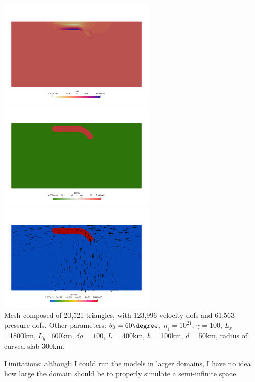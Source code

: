 \begin{center}
\includegraphics[width=7.5cm]{python_codes/fieldstone_55/images/press}\\
\includegraphics[width=7.5cm]{python_codes/fieldstone_55/images/rho}
\includegraphics[width=7.5cm]{python_codes/fieldstone_55/images/eta}\\
{\scriptsize Mesh composed of 20,521 triangles, with 123,996 velocity dofs and 61,563 pressure dofs.
Other parameters: $\theta_0=60\degree$, $\eta_1=10^{21}$, $\gamma=100$, 
$L_x$=1800km, $L_y$=600km, $\delta\rho=100$, $L=$400km, $h=$100km, $d=$50km, radius of curved slab 300km. }
\end{center}

Limitations: although I could run the models in larger domains, I have no idea how large the domain
should be to properly simulate a semi-infinite space.

